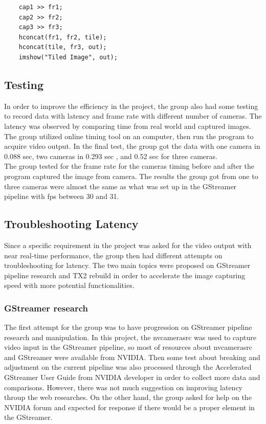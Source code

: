 \documentclass[letterpaper,10pt,serif,draftclsnofoot,onecolumn,compsoc,titlepage]{IEEEtran}
\begin{document}
\begin{lstlisting}
    cap1 >> fr1;
    cap2 >> fr2;
    cap3 >> fr3;
    hconcat(fr1, fr2, tile);          
    hconcat(tile, fr3, out);
    imshow("Tiled Image", out);
\end{lstlisting}

\subsection{Testing}

In order to improve the efficiency in the project, the group also had some testing to record 
data with latency and frame rate with different number of cameras. The latency was observed by 
comparing time from real world and captured images. The group utilized online timing tool on 
an computer, then run the program to acquire video output. In the final test, the group got 
the data with one camera in 0.088 sec, two cameras in 0.293 sec , and 0.52 sec for three 
cameras. \\

The group tested for the frame rate for the cameras timing before and after the program 
captured the image from camera. The results the group got from one to three cameras were 
almost the same as what was set up in the GStreamer pipeline with fps between 30 and 31. \\

\subsection{Troubleshooting Latency}
Since a specific requirement in the project was asked for the video output with near real-time 
performance, the group then had different attempts on troubleshooting for latency. The two main 
topics were proposed on GStreamer pipeline research and TX2 rebuild in order to accelerate the 
image capturing speed with more potential functionalities. \\

\subsubsection{GStreamer research}

The first attempt for the group was to have progression on GStreamer pipeline research and 
manipulation. In this project, the nvcamerasrc was used to capture video input in the GStreamer 
pipeline, so most of resources about nvcamerasrc and GStreamer were available from NVIDIA. Then 
some test about breaking and adjustment on the current pipeline was also processed through the 
Accelerated GStreamer User Guide from NVIDIA developer in order to collect more data and 
comparisons. However, there was not much suggestion on improving latency throup the web 
researches. On the other hand, the group asked for help on the NVIDIA forum and expected for 
response if there would be a proper element in the GStreamer. \\
\end{document}
